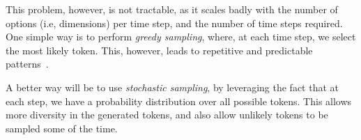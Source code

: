 
\par This problem, however, is not tractable, as it scales badly with the number of options (i.e, dimensions) per time step, and the number of time steps required. One simple way is to perform \textit{greedy sampling}, where, at each time step, we select the most likely token. This, however, leads to repetitive and predictable patterns~\citep{chollet2017book}.

\par A better way will be to use \textit{stochastic sampling}, by leveraging the fact that at each step, we have a probability distribution over all possible tokens. This allows more diversity in the generated tokens, and also allow unlikely tokens to be sampled some of the time.

